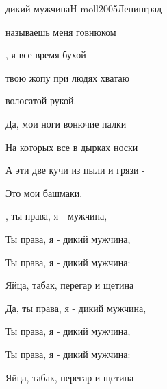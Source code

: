 \begin{song}{дикий мужчина}{H-moll}{2005}{Ленинград}{}{}

	\begin{SBVerse}
	 называешь меня говнюком

	, я все время бухой

	 твою жопу при людях хватаю

	 волосатой рукой.
	\end{SBVerse}

	\begin{SBVerse}
	Да, мои ноги вонючие палки

	На которых все в дырках носки

	А эти две кучи из пыли и грязи -

	Это мои башмаки.
	\end{SBVerse}

	\begin{SBChorus}
	, ты права, я -  мужчина,

	Ты права, я - дикий мужчина,

	Ты права, я - дикий мужчина:

	Яйца, табак, перегар и щетина
	\end{SBChorus}

	\begin{SBChorus}
	Да, ты права, я - дикий мужчина,

	Ты права, я - дикий мужчина,

	Ты права, я - дикий мужчина:

	Яйца, табак, перегар и щетина
	\end{SBChorus}
\end{song}
